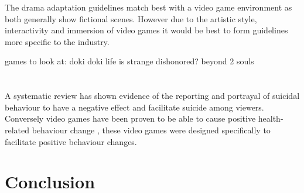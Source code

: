 \documentclass{scrartcl}
\begin{document}
	The drama adaptation guidelines match best with a video game environment as both generally show fictional scenes. However due to the artistic style, interactivity and immersion of video games it would be best to form guidelines more specific to the industry. 	

	games to look at:
	doki doki
	life is strange
	dishonored?
	beyond 2 souls
	\section{}
		A systematic review\cite{pirkis2001suicide} has shown evidence of the reporting and portrayal of suicidal behaviour to have a negative effect and facilitate suicide among viewers. Conversely video games have been proven to be able to cause positive health-related behaviour change \cite{baranowski2008playing}, these video games were designed specifically to facilitate positive behaviour changes.
	\section{}
	
	\section{Conclusion}

	
	
	
\end{document}

